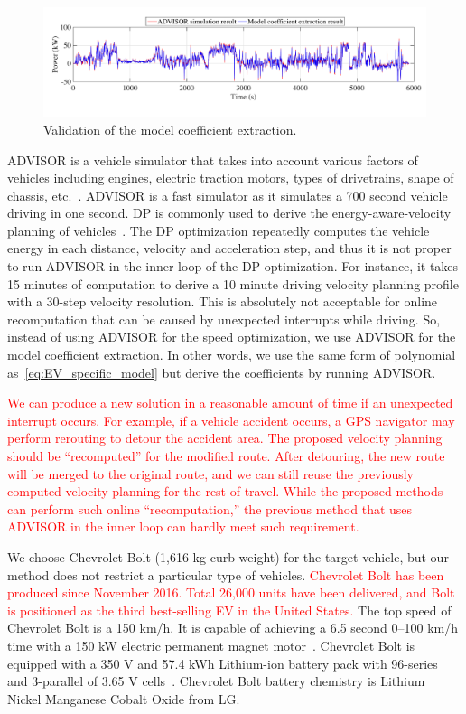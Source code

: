 \documentclass{IEEEtran}
\begin{document}
\begin{figure}	%
\includegraphics[width=1.0\hsize]{Figures/ADVISOR_model_validation_result.pdf}
\caption{Validation of the model coefficient extraction.}
\label{fig:ADVISOR_model_validation}
\end{figure} 

ADVISOR is a vehicle simulator that takes into account various factors of vehicles including engines, electric traction motors, types of drivetrains, shape of chassis, etc.~\cite{Markel:JPS02}. ADVISOR is a fast simulator as it simulates a 700 second vehicle driving in one second. DP is commonly used to derive the energy-aware-velocity planning of vehicles~\cite{Lin:ICCA14,Dib:IVPPC11}. The DP optimization repeatedly computes the vehicle energy in each distance, velocity and acceleration step, and thus it is not proper to run ADVISOR in the inner loop of the DP optimization. For instance, it takes 15 minutes of computation to derive a 10 minute driving velocity planning profile with a 30-step velocity resolution. This is absolutely not acceptable for online recomputation that can be caused by unexpected interrupts while driving. So, instead of using ADVISOR for the speed optimization, we use ADVISOR for the model coefficient extraction. In other words, we use the same form of polynomial as~\eqref{eq:EV_specific_model} but derive the coefficients by running ADVISOR. 

\textcolor{red}{We can produce a new solution in a reasonable amount of time if an unexpected interrupt occurs. For example, if a vehicle accident occurs, a GPS navigator may perform rerouting to detour the accident area. The proposed velocity planning should be ``recomputed'' for the modified route. After detouring, the new route will be merged to the original route, and we can still reuse the previously computed  velocity planning for the rest of travel. While the proposed methods can perform such online ``recomputation,'' the previous method that uses ADVISOR in the inner loop can hardly meet such requirement.}

We choose Chevrolet Bolt (1,616 kg curb weight) for the target vehicle, but our method does not restrict a particular type of vehicles. \textcolor{red}{Chevrolet Bolt has been produced since November 2016. Total 26,000 units have been  delivered, and Bolt is positioned as the third best-selling EV in the United States.} The top speed of Chevrolet Bolt is a 150 km/h. It is capable of achieving a 6.5 second 0--100 km/h time with a 150 kW electric permanent magnet motor~\cite{GM_Bolt:official}. Chevrolet Bolt is equipped with a 350 V and 57.4 kWh Lithium-ion battery pack with 96-series and 3-parallel of 3.65 V cells~\cite{GM_Bolt:spec}. Chevrolet Bolt battery chemistry is Lithium Nickel Manganese Cobalt Oxide from LG. 
\end{document}
